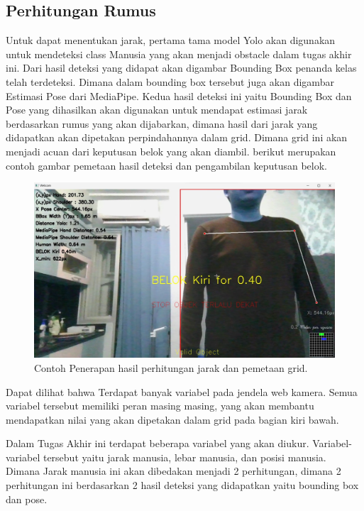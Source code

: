 \subsection{Perhitungan Rumus}

Untuk dapat menentukan jarak, pertama tama model Yolo akan digunakan untuk mendeteksi class Manusia yang akan menjadi obstacle dalam tugas akhir ini. Dari hasil deteksi yang didapat akan digambar Bounding Box penanda kelas telah terdeteksi. Dimana dalam bounding box tersebut juga akan digambar Estimasi Pose dari MediaPipe. Kedua hasil deteksi ini yaitu Bounding Box dan Pose yang dihasilkan akan digunakan untuk mendapat estimasi jarak berdasarkan rumus yang akan dijabarkan, dimana hasil dari jarak yang didapatkan akan dipetakan perpindahannya dalam grid. Dimana grid ini akan menjadi acuan dari keputusan belok yang akan diambil. berikut merupakan contoh gambar pemetaan hasil deteksi dan pengambilan keputusan belok.

\begin{figure}[H]
  \centering
  \includegraphics[scale=0.35]{gambar/belokkiri.jpg}
  \caption{Contoh Penerapan hasil perhitungan jarak dan pemetaan grid.}
  \label{fig:Penerapan hasil perhitungan jarak dan pemetaan grid}
\end{figure}

Dapat dilihat bahwa Terdapat banyak variabel pada jendela web kamera. Semua variabel tersebut memiliki peran masing masing, yang akan membantu mendapatkan nilai yang akan dipetakan dalam grid pada bagian kiri bawah.

Dalam Tugas Akhir ini terdapat beberapa variabel yang akan diukur. Variabel-variabel tersebut yaitu jarak manusia, lebar manusia, dan posisi manusia. Dimana Jarak manusia ini akan dibedakan menjadi 2 perhitungan, dimana 2 perhitungan ini berdasarkan 2 hasil deteksi yang didapatkan yaitu bounding box dan pose.


